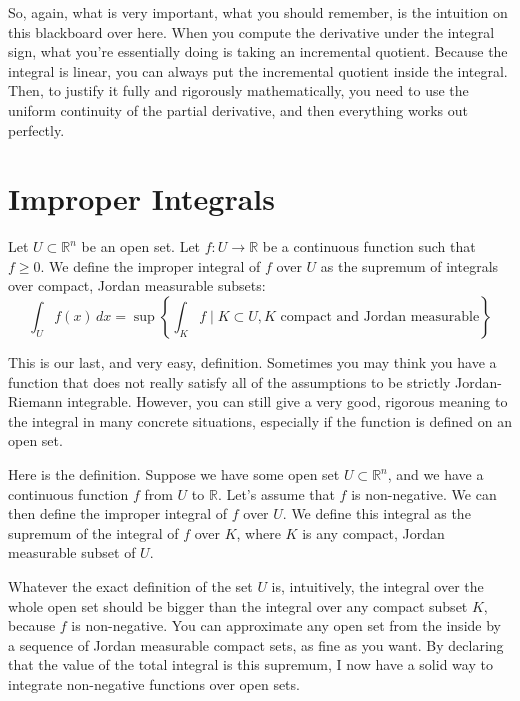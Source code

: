\begin{spoken-clean}[00:06:18 - 00:08:45]
So, again, what is very important, what you should remember, is the intuition on this blackboard over here. When you compute the derivative under the integral sign, what you're essentially doing is taking an incremental quotient. Because the integral is linear, you can always put the incremental quotient inside the integral. Then, to justify it fully and rigorously mathematically, you need to use the uniform continuity of the partial derivative, and then everything works out perfectly.
\end{spoken-clean}

\section{Improper Integrals}

\begin{orange-formula}
\begin{definition}
Let $U \subset \mathbb{R}^n$ be an open set. Let $f: U \to \mathbb{R}$ be a continuous function such that $f \ge 0$.
We define the improper integral of $f$ over $U$ as the supremum of integrals over compact, Jordan measurable subsets:
\[
\int_U f(x) \, dx = \sup \left\{ \int_K f \mid K \subset U, K \text{ compact and Jordan measurable} \right\}
\]
\end{definition}
\end{orange-formula}

\begin{spoken-clean}[00:08:45 - 00:12:07]
This is our last, and very easy, definition. Sometimes you may think you have a function that does not really satisfy all of the assumptions to be strictly Jordan-Riemann integrable. However, you can still give a very good, rigorous meaning to the integral in many concrete situations, especially if the function is defined on an open set.

Here is the definition. Suppose we have some open set $U \subset \mathbb{R}^n$, and we have a continuous function $f$ from $U$ to $\mathbb{R}$. Let's assume that $f$ is non-negative. We can then define the improper integral of $f$ over $U$. We define this integral as the supremum of the integral of $f$ over $K$, where $K$ is any compact, Jordan measurable subset of $U$.

Whatever the exact definition of the set $U$ is, intuitively, the integral over the whole open set should be bigger than the integral over any compact subset $K$, because $f$ is non-negative. You can approximate any open set from the inside by a sequence of Jordan measurable compact sets, as fine as you want. By declaring that the value of the total integral is this supremum, I now have a solid way to integrate non-negative functions over open sets.
\end{spoken-clean}

